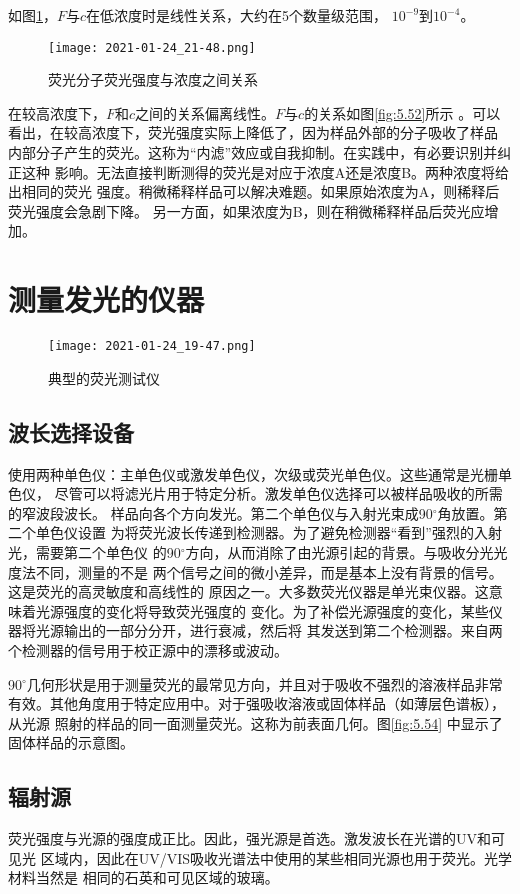 如图\ref{fig:5.51}，$F$与$c$在低浓度时是线性关系，大约在5个数量级范围，
$10^{-9}$到$10^{-4}$。
\begin{figure}[htpb]
    \centering
    \texttt{[image: 2021-01-24\_21-48.png]}
    \caption{荧光分子荧光强度与浓度之间关系}
    \label{fig:5.51}
\end{figure}

在较高浓度下，$F$和$c$之间的关系偏离线性。$F$与$c$的关系如图\ref{fig:5.52}所示
。可以看出，在较高浓度下，荧光强度实际上降低了，因为样品外部的分子吸收了样品
内部分子产生的荧光。这称为“内滤”效应或自我抑制。在实践中，有必要识别并纠正这种
影响。无法直接判断测得的荧光是对应于浓度A还是浓度B。两种浓度将给出相同的荧光
强度。稍微稀释样品可以解决难题。如果原始浓度为A，则稀释后荧光强度会急剧下降。
另一方面，如果浓度为B，则在稍微稀释样品后荧光应增加。
\section{测量发光的仪器}
\begin{figure}[htpb]
    \centering
    \texttt{[image: 2021-01-24\_19-47.png]}
    \caption{典型的荧光测试仪}
    \label{fig:5.53}
\end{figure}
\subsection{波长选择设备}
使用两种单色仪：主单色仪或激发单色仪，次级或荧光单色仪。这些通常是光栅单色仪，
尽管可以将滤光片用于特定分析。激发单色仪选择可以被样品吸收的所需的窄波段波长。
样品向各个方向发光。第二个单色仪与入射光束成90$^\circ$角放置。第二个单色仪设置
为将荧光波长传递到检测器。为了避免检测器“看到”强烈的入射光，需要第二个单色仪
的90$^\circ$方向，从而消除了由光源引起的背景。与吸收分光光度法不同，测量的不是
两个信号之间的微小差异，而是基本上没有背景的信号。这是荧光的高灵敏度和高线性的
原因之一。大多数荧光仪器是单光束仪器。这意味着光源强度的变化将导致荧光强度的
变化。为了补偿光源强度的变化，某些仪器将光源输出的一部分分开，进行衰减，然后将
其发送到第二个检测器。来自两个检测器的信号用于校正源中的漂移或波动。

90$^\circ$几何形状是用于测量荧光的最常见方向，并且对于吸收不强烈的溶液样品非常
有效。其他角度用于特定应用中。对于强吸收溶液或固体样品（如薄层色谱板），从光源
照射的样品的同一面测量荧光。这称为前表面几何。图\ref{fig:5.54}
中显示了固体样品的示意图。
\subsection{辐射源}
荧光强度与光源的强度成正比。因此，强光源是首选。激发波长在光谱的UV和可见光
区域内，因此在UV/VIS吸收光谱法中使用的某些相同光源也用于荧光。光学材料当然是
相同的石英和可见区域的玻璃。

